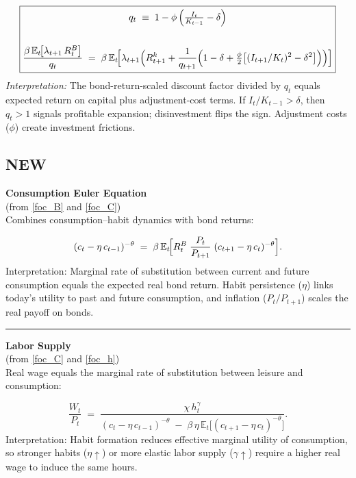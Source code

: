 \documentclass[11pt,preprint]{elsarticle}
\numberwithin{equation}{section}
\numberwithin{figure}{section}
\numberwithin{table}{section}
\begin{document}
\[
\boxed{
  \begin{gathered}
  q_t \;\equiv\; 1 - \phi\,\Bigl(\tfrac{I_t}{K_{t-1}} - \delta\Bigr) \\
  \\
  \frac{\beta\,\mathbb{E}_t\!\bigl[\lambda_{t+1}\,R_t^B\bigr]}{q_t}
  \;=\;
  \beta\,\mathbb{E}_t\!\Bigl[
    \lambda_{t+1}\Bigl(
      R_{t+1}^k
      + \frac{1}{q_{t+1}}
        \Bigl(
          1 - \delta
          + \tfrac{\phi}{2}\bigl[(I_{t+1}/K_t)^2 - \delta^2\bigr]
        \Bigr)
    \Bigr)
  \Bigr]
  \end{gathered}
}
\] \textit{Interpretation:} The bond-return-scaled discount factor
divided by \(q_t\) equals expected return on capital plus
adjustment-cost terms. If \(I_t/K_{t-1}>\delta\), then \(q_t>1\) signals
profitable expansion; disinvestment flips the sign. Adjustment costs
(\(\phi\)) create investment frictions.

\newpage

\subsection{NEW}\label{new}

\textbf{Consumption Euler Equation}\\
(from \eqref{foc_B} and \eqref{foc_C})\\
Combines consumption--habit dynamics with bond returns:

\[
  (c_t - \eta\,c_{t-1})^{-\theta}
  \;=\;
  \beta\,\mathbb{E}_t\!\Bigl[
    R_t^B \;\frac{P_t}{P_{t+1}}\;(c_{t+1} - \eta\,c_t)^{-\theta}
  \Bigr].
\] Interpretation: Marginal rate of substitution between current and
future consumption equals the expected real bond return. Habit
persistence (\(\eta\)) links today's utility to past and future
consumption, and inflation (\(P_t/P_{t+1}\)) scales the real payoff on
bonds.

\begin{center}\rule{0.5\linewidth}{0.5pt}\end{center}

\textbf{Labor Supply}\\
(from \eqref{foc_C} and \eqref{foc_h})\\
Real wage equals the marginal rate of substitution between leisure and
consumption:

\[
  \frac{W_t}{P_t}
  \;=\;
  \frac{\chi\,h_t^{\gamma}}
       {(c_t - \eta\,c_{t-1})^{-\theta}
        \;-\;
        \beta\,\eta\,\mathbb{E}_t\!\bigl[(c_{t+1} - \eta\,c_t)^{-\theta}\bigr]}.
\] Interpretation: Habit formation reduces effective marginal utility of
consumption, so stronger habits (\(\eta\uparrow\)) or more elastic labor
supply (\(\gamma\uparrow\)) require a higher real wage to induce the
same hours.
\end{document}
